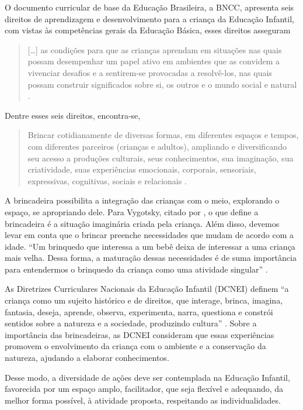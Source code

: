 \begin{refsection}
    O documento curricular de base da Educação Brasileira, a BNCC, apresenta seis direitos de aprendizagem e desenvolvimento para a criança da Educação Infantil, com vistas às competências gerais da Educação Básica, esses direitos asseguram 

    \begin{quotation}
        [\dots] as condições para que as crianças aprendam em situações nas quais possam desempenhar um papel ativo em ambientes que as convidem a vivenciar desafios e a sentirem-se provocadas a resolvê-los, nas quais possam construir significados sobre si, os outros e o mundo social e natural \cite[p.~35]{BaNacCurEF2017}.
    \end{quotation}

    Dentre esses seis direitos, encontra-se,  

    \begin{quotation}
        Brincar cotidianamente de diversas formas, em diferentes espaços e tempos, com diferentes parceiros (crianças e adultos), ampliando e diversificando seu acesso a produções culturais, seus conhecimentos, sua imaginação, sua criatividade, suas experiências emocionais, corporais, sensoriais, expressivas, cognitivas, sociais e relacionais \cite[p.~36]{BaNacCurEF2017}.
    \end{quotation}

    A brincadeira possibilita a integração das crianças com o meio, explorando o espaço, se apropriando dele. Para Vygotsky, citado por \textcite{KISHIMOTO1999Jogo}, o que define a brincadeira é a situação imaginária criada pela criança. Além disso, devemos levar em conta que o brincar preenche necessidades que mudam de acordo com a idade. “Um brinquedo que interessa a um bebê deixa de interessar a uma criança mais velha. Dessa forma, a maturação dessas necessidades é de suma importância para entendermos o brinquedo da criança como uma atividade singular” \cite[p.~60]{KISHIMOTO1999Jogo}.

    As Diretrizes Curriculares Nacionais da Educação Infantil (DCNEI) definem “a criança como um sujeito histórico e de direitos, que interage, brinca, imagina, fantasia, deseja, aprende, observa, experimenta, narra, questiona e constrói sentidos sobre a natureza e a sociedade, produzindo cultura” \cite[p.~94]{DCN2009}. Sobre a importância das brincadeiras, as DCNEI consideram que essas experiências promovem o envolvimento da criança com o ambiente e a conservação da natureza, ajudando a elaborar conhecimentos. 

    Desse modo, a diversidade de ações deve ser contemplada na Educação Infantil, favorecida por um espaço amplo, facilitador, que seja flexível e adequando, da melhor forma possível, à atividade proposta, respeitando as individualidades. 


\end{refsection}
